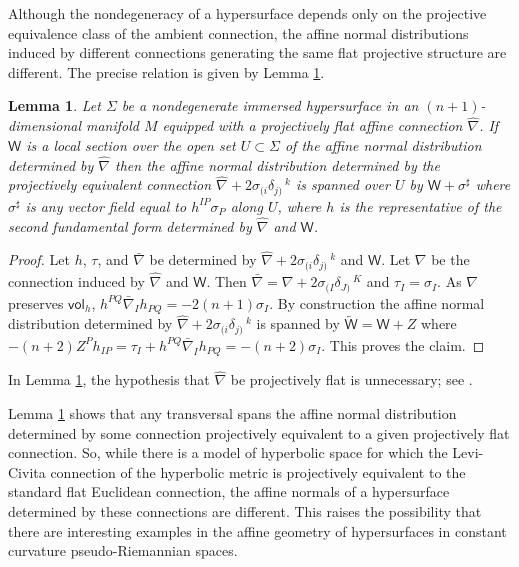 \documentclass [leqno, 10pt]{amsart}
\newtheorem{lemma}[theorem]{Lemma}
\theoremstyle{definition}
\numberwithin{equation}{section}
\newcommand{\vol}{\mathsf{vol}}
\newcommand{\nm}{\mathsf{W}}
\newcommand{\si}{\sigma}
\newcommand{\bnabla}{\bar{\nabla}}
\newcommand{\hnabla}{\widehat{\nabla}}
\begin{document}
Although the nondegeneracy of a hypersurface depends only on the projective equivalence class of the ambient connection, the affine normal distributions induced by different connections generating the same flat projective structure are different. The precise relation is given by Lemma \ref{projchangelemma}.

\begin{lemma}\label{projchangelemma}
Let $\Sigma$ be a nondegenerate immersed hypersurface in an $(n+1)$-dimensional manifold $M$ equipped with a projectively flat affine connection $\hnabla$. If $\nm$ is a local section over the open set $U \subset \Sigma$ of the affine normal distribution determined by $\hnabla$ then the affine normal distribution determined by the projectively equivalent connection $\hnabla + 2\si_{(i}\delta_{j)}\,^{k}$ is spanned over $U$ by $\nm + \si^{\sharp}$ where $\si^{\sharp}$ is any vector field equal to $h^{IP}\si_{P}$ along $U$, where $h$ is the representative of the second fundamental form determined by $\hnabla$ and $\nm$.
\end{lemma}
\begin{proof}
Let $h$, $\tau$, and $\bnabla$ be determined by $\hnabla +  2\si_{(i}\delta_{j)}\,^{k}$ and $\nm$. Let $\nabla$ be the connection induced by $\hnabla$ and $\nm$. Then $\bnabla = \nabla + 2\si_{(I}\delta_{J)}\,^{K}$ and $\tau_{I} = \si_{I}$. As $\nabla$ preserves $\vol_{h}$, $h^{PQ}\bnabla_{I}h_{PQ} = -2(n+1)\si_{I}$. By construction the affine normal distribution determined by $\hnabla +  2\si_{(i}\delta_{j)}\,^{k}$ is spanned by $\tilde{\nm} = \nm + Z$ where $-(n+2)Z^{P}h_{IP} = \tau_{I} + h^{PQ}\bnabla_{I}h_{PQ} = -(n+2)\si_{I}$. This proves the claim. 
\end{proof}
\begin{remark}
In Lemma \ref{projchangelemma}, the hypothesis that $\hnabla$ be projectively flat is unnecessary; see \cite{Fox-ahs}.
\end{remark}

Lemma \ref{projchangelemma} shows that any transversal spans the affine normal distribution determined by some connection projectively equivalent to a given projectively flat connection. So, while there is a model of hyperbolic space for which the Levi-Civita connection of the hyperbolic metric is projectively equivalent to the standard flat Euclidean connection, the affine normals of a hypersurface determined by these connections are different. This raises the possibility that there are interesting examples in the affine geometry of hypersurfaces in constant curvature pseudo-Riemannian spaces. 
\end{document}
